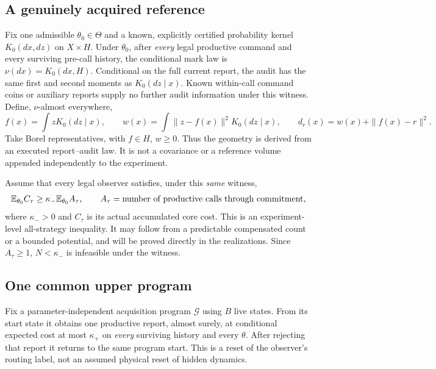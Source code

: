 \subsection*{A genuinely acquired reference}
Fix one admissible $\theta_0\in\Theta$ and a known, explicitly certified probability kernel $K_0(dx,dz)$ on $X\times H$. Under $\theta_0$, after \emph{every} legal productive command and every surviving pre-call history, the conditional mark law is $\nu(dx)=K_0(dx,H)$. Conditional on the full current report, the audit has the same first and second moments as $K_0(dz\mid x)$. Known within-call command coins or auxiliary reports supply no further audit information under this witness. Define, $\nu$-almost everywhere,
\begin{equation}\label{eq:derived}
 f(x)=\int zK_0(dz\mid x),\qquad
 w(x)=\int\|z-f(x)\|^2K_0(dz\mid x),\qquad
 d_r(x)=w(x)+\|f(x)-r\|^2.
\end{equation}
Take Borel representatives, with $f\in H$, $w\ge0$. Thus the geometry is derived from an executed report--audit law. It is not a covariance or a reference volume appended independently to the experiment.

Assume that every legal observer satisfies, under this \emph{same} witness,
\begin{equation}\label{eq:effort}
 \mathbb E_{\theta_0} C_\tau\ge\kappa_-\mathbb E_{\theta_0} A_\tau,
 \qquad A_\tau=\text{number of productive calls through commitment},
\end{equation}
where $\kappa_->0$ and $C_\tau$ is its actual accumulated core cost. This is an experiment-level all-strategy inequality. It may follow from a predictable compensated count or a bounded potential, and will be proved directly in the realizations. Since $A_\tau\ge1$, $N<\kappa_-$ is infeasible under the witness.

\subsection*{One common upper program}
Fix a parameter-independent acquisition program $\mathcal G$ using $B$ live states. From its start state it obtains one productive report, almost surely, at conditional expected cost at most $\kappa_+$ on \emph{every} surviving history and every $\theta$. After rejecting that report it returns to the same program start. This is a reset of the observer's routing label, not an assumed physical reset of hidden dynamics.

